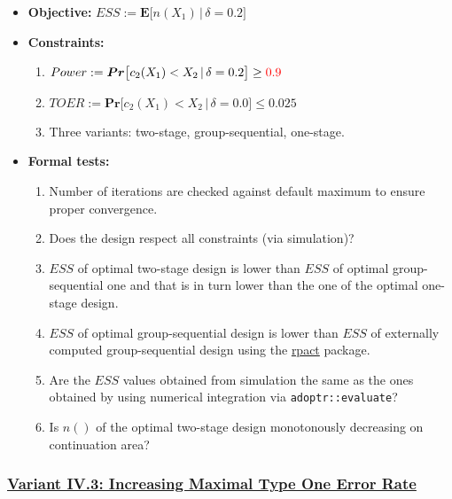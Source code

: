 \documentclass[
]{book}
\providecommand{\tightlist}{%
  \setlength{\itemsep}{0pt}\setlength{\parskip}{0pt}}
\begin{document}
\begin{itemize}
\tightlist
\item
  \textbf{Objective:} \(ESS := \boldsymbol{E}\big[n(X_1)\,|\,\delta=0.2\big]\)
\item
  \textbf{Constraints:}

  \begin{enumerate}
  \def\labelenumi{\arabic{enumi}.}
  \tightlist
  \item
    \(Power := \boldsymbol{Pr}\big[c_2(X_1) < X_2\,|\,\delta=0.2\big] \geq \color{red}{0.9}\)
  \item
    \(TOER := \boldsymbol{Pr}\big[c_2(X_1) < X_2\,|\,\delta=0.0\big] \leq 0.025\)
  \item
    Three variants: two-stage, group-sequential, one-stage.
  \end{enumerate}
\item
  \textbf{Formal tests:}

  \begin{enumerate}
  \def\labelenumi{\arabic{enumi}.}
  \tightlist
  \item
    Number of iterations are checked against default maximum to ensure proper
    convergence.
  \item
    Does the design respect all constraints (via simulation)?
  \item
    \(ESS\) of optimal two-stage design is lower than \(ESS\) of optimal
    group-sequential one and that is in turn lower than the one of the
    optimal one-stage design.
  \item
    \(ESS\) of optimal group-sequential design is lower than \(ESS\) of
    externally computed group-sequential design using the \href{https://rpact.org/}{rpact} package.
  \item
    Are the \(ESS\) values obtained from simulation the same as the ones
    obtained by using numerical integration via \texttt{adoptr::evaluate}?
  \item
    Is \(n()\) of the optimal two-stage design monotonously decreasing on
    continuation area?
  \end{enumerate}
\end{itemize}

\hypertarget{variant-iv.3-increasing-maximal-type-one-error-rate}{%
\subsubsection{\texorpdfstring{\protect\hyperlink{variantIV_3}{Variant IV.3: Increasing Maximal Type One Error Rate}}{Variant IV.3: Increasing Maximal Type One Error Rate}}\label{variant-iv.3-increasing-maximal-type-one-error-rate}}
\end{document}
